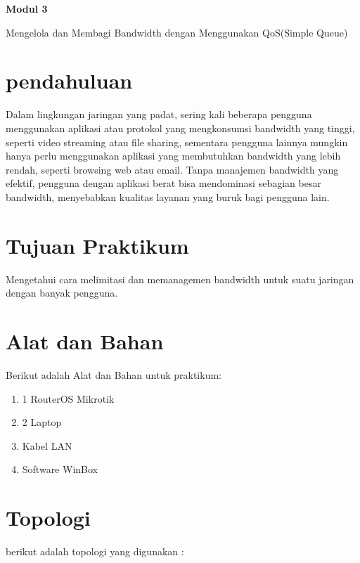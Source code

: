 \newpage
\setcounter{section}{0}
\renewcommand{\thesection}{\arabic{section}}

\begin{center}
    \Huge
    \textbf{Modul 3}
    
    Mengelola dan Membagi Bandwidth dengan Menggunakan QoS(Simple Queue) 

\end{center}


\section{pendahuluan}

Dalam lingkungan jaringan yang padat, sering kali beberapa pengguna menggunakan aplikasi atau protokol yang mengkonsumsi bandwidth yang tinggi, seperti video streaming atau file sharing, sementara pengguna lainnya mungkin hanya perlu menggunakan aplikasi yang membutuhkan bandwidth yang lebih rendah, seperti browsing web atau email. Tanpa manajemen bandwidth yang efektif, pengguna dengan aplikasi berat bisa mendominasi sebagian besar bandwidth, menyebabkan kualitas layanan yang buruk bagi pengguna lain.

\section{Tujuan Praktikum}

Mengetahui cara melimitasi dan memanagemen bandwidth untuk suatu jaringan dengan banyak pengguna.

\section{Alat dan Bahan}

Berikut adalah Alat dan Bahan untuk praktikum:
\begin{enumerate}
    \item 1 RouterOS Mikrotik
    \item 2 Laptop
    \item Kabel LAN 
    \item Software WinBox
\end{enumerate}

\section{Topologi}

berikut adalah topologi yang digunakan :

